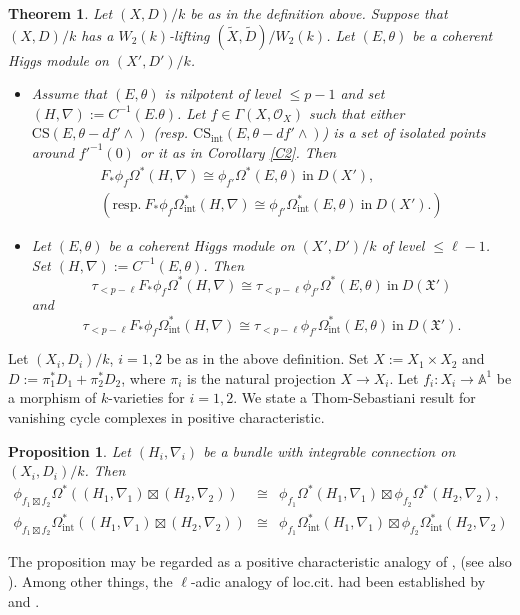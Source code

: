 \documentclass[12pt, a4paper]{article}
\newtheorem{proposition}{Proposition}[section]
\newtheorem{theorem}{Theorem}[section]
\begin{document}
\begin{theorem}\label{vanishing cycle}
Let $(X,D)/k$ be as in the definition above. Suppose that $(X,D)/k$ has a $W_2(k)$-lifting $(\tilde X,\tilde D)/W_2(k)$. Let $(E,\theta)$ be a coherent Higgs module on $(X',D')/k$.
\begin{itemize}
\item[(i)\ ] Assume that $(E,\theta)$ is nilpotent of level $\leq p-1$ and set $(H,\nabla):=C^{-1}(E.\theta)$. Let $f\in\Gamma(X,\mathcal O_X)$ such that either $\mathrm{CS}(E,\theta-df'\wedge)$ (resp. $\mathrm{CS}_{\mathrm{int}}(E,\theta-df'\wedge)$) is a set of isolated points around $f'^{-1}(0)$ or it as in Corollary \ref{C2}. Then 
$$
\begin{array}{c}
F_*\phi_f\Omega^*(H,\nabla)\cong\phi_{f'}\Omega^*(E,\theta)~\mathrm{in}~D(X'),\\
(\mathrm{resp.}~F_*\phi_f\Omega_\mathrm{int}^*(H,\nabla)\cong\phi_{f'}\Omega_\mathrm{int}^*(E,\theta)~\mathrm{in}~D(X').)
\end{array}
$$
\item[(ii)\ ]Let $(E,\theta)$ be a coherent Higgs module on $(X',D')/k$ of level $\leq\ell-1$. Set $(H,\nabla):=C^{-1}(E,\theta)$. Then
$$
\tau_{<p-\ell}F_*\phi_f\Omega^*(H,\nabla)\cong\tau_{<p-\ell}\phi_{f'}\Omega^*(E,\theta)~\mathrm{in}~D(\mathfrak X')
$$
and
$$
\tau_{<p-\ell}F_*\phi_f\Omega_\mathrm{int}^*(H,\nabla)\cong\tau_{<p-\ell}\phi_{f'}\Omega_\mathrm{int}^*(E,\theta)~\mathrm{in}~D(\mathfrak X').
$$
\end{itemize}
\end{theorem}
Let $(X_i,D_i)/k$, $i=1,2$ be as in the above definition. Set $X:=X_1\times X_2$ and $D:=\pi_1^*D_1+\pi_2^*D_2$, where $\pi_i$ is the natural projection $X\to X_i$. Let $f_i:X_i\to\mathbb A^1$ be a morphism of $k$-varieties for $i=1,2$. We state a Thom-Sebastiani result for vanishing cycle complexes in positive characteristic.
\begin{proposition}
Let $(H_i,\nabla_i)$ be a bundle with integrable connection on $(X_i,D_i)/k$. Then
$$
\begin{array}{rcl}
\phi_{f_1\boxtimes f_2}\Omega^*((H_1,\nabla_1)\boxtimes(H_2,\nabla_2))&\cong&\phi_{f_1}\Omega^*(H_1,\nabla_1)\boxtimes\phi_{f_2}\Omega^*(H_2,\nabla_2),\\
\phi_{f_1\boxtimes f_2}\Omega_\mathrm{int}^*((H_1,\nabla_1)\boxtimes(H_2,\nabla_2))&\cong&\phi_{f_1}\Omega_\mathrm{int}^*(H_1,\nabla_1)\boxtimes\phi_{f_2}\Omega_\mathrm{int}^*(H_2,\nabla_2)
\end{array}
$$
\end{proposition}
The proposition may be regarded as a positive characteristic analogy of \cite{TS}, \cite{Massy} (see also \cite[corollary 2.17, Theorem 4.25]{Max}). Among other things, the $\ell$-adic analogy of loc.cit. had been established by \cite{Fu} and \cite{I17}.
\end{document}
